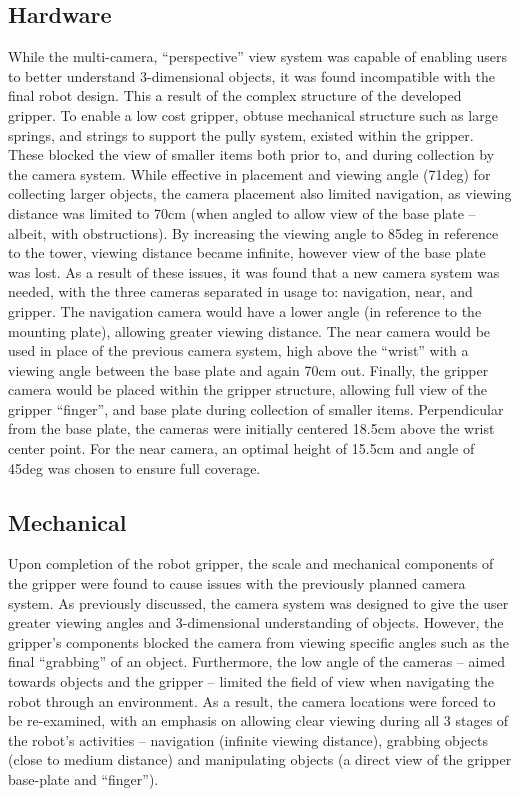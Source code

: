 \documentclass[11pt]{article} %
\begin{document}
\subsection{Hardware}
While the multi-camera, “perspective” view system was capable of enabling users to better understand 3-dimensional objects, it was found incompatible with the final robot design. This a result of the complex structure of the developed gripper. To enable a low cost gripper, obtuse mechanical structure such as large springs, and strings to support the pully system, existed within the gripper. These blocked the view of smaller items both prior to, and during collection by the camera system. While effective in placement and viewing angle (71deg) for collecting larger objects, the camera placement also limited navigation, as viewing distance was limited to 70cm (when angled to allow view of the base plate – albeit, with obstructions). By increasing the viewing angle to 85deg in reference to the tower, viewing distance became infinite, however view of the base plate was lost. As a result of these issues, it was found that a new camera system was needed, with the three cameras separated in usage to: navigation, near, and gripper.  The navigation camera would have a lower angle (in reference to the mounting plate), allowing greater viewing distance. The near camera would be used in place of the previous camera system, high above the “wrist” with a viewing angle between the base plate and again 70cm out. Finally, the gripper camera would be placed within the gripper structure, allowing full view of the gripper “finger”, and base plate during collection of smaller items.
Perpendicular from the base plate, the cameras were initially centered 18.5cm above the wrist center point. For the near camera, an optimal height of 15.5cm and angle of 45deg was chosen to ensure full coverage.
\subsection{Mechanical}
Upon completion of the robot gripper, the scale and mechanical components of the gripper were found to cause issues with the previously planned camera system. As previously discussed, the camera system was designed to give the user greater viewing angles and 3-dimensional understanding of objects. However, the gripper’s components blocked the camera from viewing specific angles such as the final “grabbing” of an object. Furthermore, the low angle of the cameras – aimed towards objects and the gripper – limited the field of view when navigating the robot through an environment.
As a result, the camera locations were forced to be re-examined, with an emphasis on allowing clear viewing during all 3 stages of the robot’s activities – navigation (infinite viewing distance), grabbing objects (close to medium distance) and manipulating objects (a direct view of the gripper base-plate and “finger”).
\end{document}
